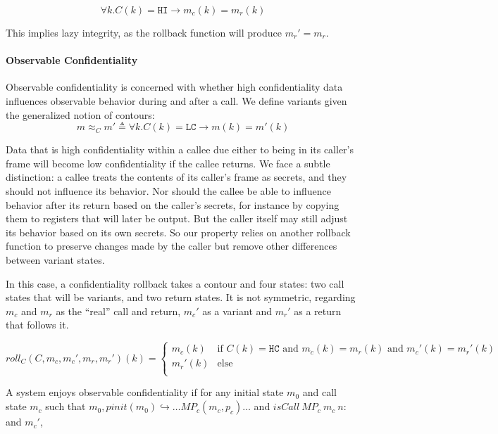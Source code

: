 \documentclass{article}
\begin{document}
      \[\forall k . C(k) = \mathtt{HI} \rightarrow m_c(k) = m_r(k)\]

      This implies lazy integrity, as the rollback function will produce \(m_r' = m_r\).
 
    \paragraph{Observable Confidentiality}

      Observable confidentiality is concerned with whether high confidentiality data influences
      observable behavior during and after a call. We define variants given the generalized notion
      of contours:
      \[m \approx_C m' \triangleq \forall k . C(k) = \mathtt{LC} \rightarrow m(k) = m'(k)\]

      Data that is high confidentiality within a callee due either to being in its caller's frame
      will become low confidentiality if the callee returns. We face a subtle distinction: 
      a callee treats the contents of its caller's frame as secrets, and they should not influence
      its behavior. Nor should the callee be able to influence behavior after its return based
      on the caller's secrets, for instance by copying them to registers that will later be output.
      But the caller itself may still adjust its behavior based on its own secrets. So our property
      relies on another rollback function to preserve changes made by the caller but remove other
      differences between variant states.

      In this case, a confidentiality rollback takes a contour and four states: two call states
      that will be variants, and two return states. It is not symmetric, regarding \(m_c\) and \(m_r\)
      as the ``real'' call and return, \(m_c'\) as a variant and \(m_r'\) as a return that follows it.

      \[\mathit{roll}_C(C,m_c,m_c',m_r,m_r')(k) =
        \begin{cases}
          m_c(k) & \text{if } C(k) = \mathtt{HC} \text{ and } m_c(k) = m_r(k) \text{ and } m_c'(k) = m_r'(k) \\
          m_r'(k) & \text{else} \\
        \end{cases}\]

      A system enjoys observable confidentiality if for any initial state \(m_0\) and call state \(m_c\)
      such that \(m_0,\mathit{pinit}(m_0) \hookrightarrow \dots MP_c (m_c,p_c) \dots\) and
      \(\mathit{isCall}\ MP_c\ m_c\ n\):
      and \(m_c'\), 
\end{document}
